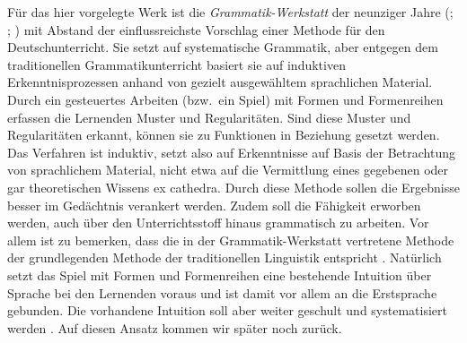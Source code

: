 Für das hier vorgelegte Werk ist die \textit{Grammatik-Werkstatt} der neunziger Jahre (\citealt{EisenbergMenzel1995}; \citealt{Menzel2017}; \citealt[Abschnitt~3.2.4]{Bredel2013}) mit Abstand der einflussreichste Vorschlag einer Methode für den Deutschunterricht.
Sie setzt auf systematische Grammatik, aber entgegen dem traditionellen Grammatikunterricht basiert sie auf induktiven Erkenntnisprozessen anhand von gezielt ausgewähltem sprachlichen Material.
Durch ein gesteuertes Arbeiten (bzw.\ ein Spiel) mit Formen und Formenreihen erfassen die Lernenden Muster und Regularitäten.
Sind diese Muster und Regularitäten erkannt, können sie zu Funktionen in Beziehung gesetzt werden.
Das Verfahren ist induktiv, setzt also auf Erkenntnisse auf Basis der Betrachtung von sprachlichem Material, nicht etwa auf die Vermittlung eines gegebenen oder gar theoretischen Wissens ex cathedra.
Durch diese Methode sollen die Ergebnisse besser im Gedächtnis verankert werden.
Zudem soll die Fähigkeit erworben werden, auch über den Unterrichtsstoff hinaus grammatisch zu arbeiten.
Vor allem ist zu bemerken, dass die in der Grammatik-Werkstatt vertretene Methode der grundlegenden Methode der traditionellen Linguistik entspricht \citep[239]{Bredel2013}.
Natürlich setzt das Spiel mit Formen und Formenreihen eine bestehende Intuition über Sprache bei den Lernenden voraus und ist damit vor allem an die Erstsprache gebunden.
Die vorhandene Intuition soll aber weiter geschult und systematisiert werden \citep[241]{Bredel2013}.
Auf diesen Ansatz kommen wir später noch zurück.

